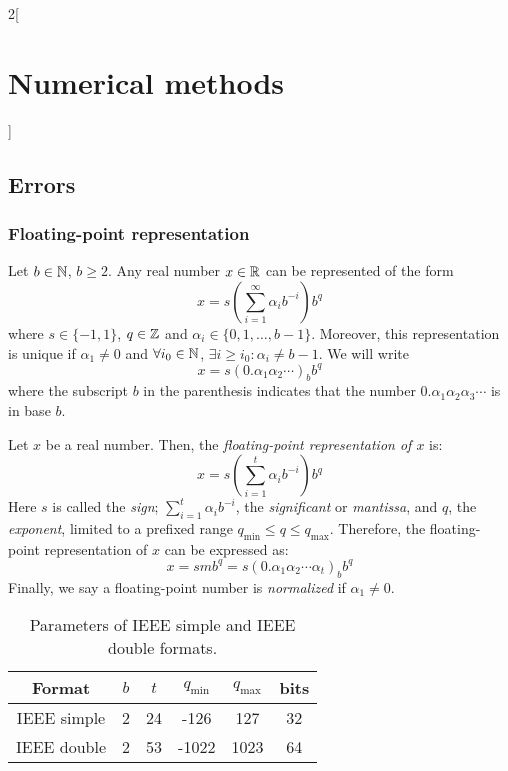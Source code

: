 \documentclass[../../../main.tex]{subfiles}
\begin{document}
\begin{multicols}{2}[\section{Numerical methods}]
\subsection{Errors}
\subsubsection*{Floating-point representation}
\begin{theorem}
    Let $b\in\mathbb{N}$, $b\geq 2$. Any real number $x\in\mathbb{R}$ can be represented of the form 
    \begin{equation*}
        x=s\left(\sum_{i=1}^\infty\alpha_ib^{-i}\right)b^q
    \end{equation*} where $s\in\{-1,1\}$, $q\in\mathbb{Z}$ and $\alpha_i\in\{0,1,\ldots,b-1\}$. Moreover, this representation is unique if $\alpha_1\ne0$ and $\forall i_0\in\mathbb{N}$, $\exists i\geq i_0:\alpha_i\ne b-1$. We will write $$x=s(0.\alpha_1\alpha_2\cdots)_bb^q$$ where the subscript $b$ in the parenthesis indicates that the number $0.\alpha_1\alpha_2\alpha_3\cdots$ is in base $b$.
\end{theorem}
\begin{definition}
    Let $x$ be a real number. Then, the \textit{floating-point representation of $x$} is: $$x=s\left(\sum_{i=1}^t\alpha_ib^{-i}\right)b^q$$ Here $s$ is called the \textit{sign}; $\sum_{i=1}^t\alpha_ib^{-i}$, the \textit{significant} or \textit{mantissa}, and $q$, the \textit{exponent}, limited to a prefixed range $q_\text{min}\leq q\leq q_\text{max}$. Therefore, the floating-point representation of $x$ can be expressed as: $$x=smb^q=s(0.\alpha_1\alpha_2\cdots\alpha_t)_bb^q$$ Finally, we say a floating-point number is \textit{normalized} if $\alpha_1\ne0$.
\end{definition}
\begin{table}[ht]
    \centering
    \begin{tabular}{c|ccccc}
        Format & $b$ & $t$ & $q_\text{min}$ & $q_\text{max}$ & bits \\
        \hline\hline
        IEEE simple & 2 & 24 & -126 & 127 & 32\\
        IEEE double & 2 & 53 & -1022 & 1023 & 64
    \end{tabular}
    \caption{Parameters of IEEE simple and IEEE double formats.}

\end{table}
\end{multicols}
\end{document}
